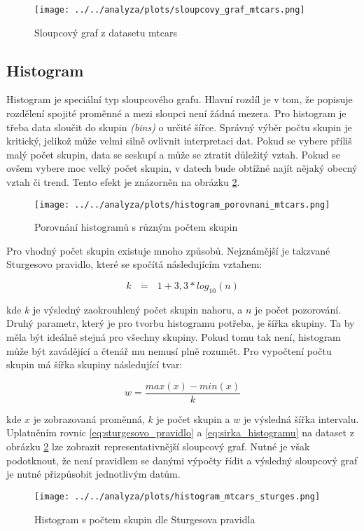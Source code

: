 \begin{figure}[H]
    \centering
    \texttt{[image: ../../analyza/plots/sloupcovy\_graf\_mtcars.png]}
    \caption{Sloupcový graf z datasetu mtcars} 
    \label{fig:sloupcovy_graf_mtcars}
\end{figure}

\subsection{Histogram}

Histogram je speciální typ sloupcového grafu. Hlavní rozdíl je v tom, že popisuje rozdělení spojité proměnné a mezi sloupci není žádná mezera.
Pro histogram je třeba data sloučit do skupin \textit{(bins)} o určité šířce. Správný výběr počtu skupin je kritický, jelikož může velmi
silně ovlivnit interpretaci dat. Pokud se vybere příliš malý počet skupin, data se seskupí a může se ztratit důležitý vztah. Pokud se ovšem
vybere moc velký počet skupin, v datech bude obtížné najít nějaký obecný vztah či trend.
Tento efekt je znázorněn na obrázku \ref{fig:histogram_porovnani_mtcars}.

\begin{figure}[H]
    \centering
    \texttt{[image: ../../analyza/plots/histogram\_porovnani\_mtcars.png]}
    \caption{Porovnání histogramů s různým počtem skupin} 
    \label{fig:histogram_porovnani_mtcars}
\end{figure}

Pro vhodný počet skupin existuje mnoho způsobů. Nejznámější je takzvané Sturgesovo pravidlo, které se spočítá následujícím vztahem:

\begin{equation}
    \label{eq:sturgesovo_pravidlo}
    k \text{ } \dot{\mathbf{=}} \text{ } 1 + 3,3 * log_{10}(n)
\end{equation}

kde $k$ je výsledný zaokrouhlený počet skupin nahoru, 
a $n$ je počet pozorování. Druhý parametr, který je pro tvorbu histogramu potřeba, je šířka skupiny.
Ta by měla být ideálně stejná pro všechny skupiny. Pokud tomu tak není, histogram může být zavádějící a čtenář mu nemusí plně rozumět.
Pro vypočtení počtu skupin má šířka skupiny následující tvar:

\begin{equation}
    \label{eq:sirka_histogramu}
    w = \frac{max(x) - min(x)}{k}
\end{equation}

kde $x$ je zobrazovaná proměnná, $k$ je počet skupin a $w$ je výsledná šířka intervalu. 
{\color{red}
Uplatněním rovnic \ref{eq:sturgesovo_pravidlo} a \ref{eq:sirka_histogramu} na dataset z obrázku \ref{fig:histogram_porovnani_mtcars}
lze zobrazit representativnější sloupcový graf. Nutné je však podotknout, že není pravidlem se danými výpočty řídit a výsledný
sloupcový graf je nutné přizpůsobit jednotlivým datům.
}
\begin{figure}[H]
    \centering
    \texttt{[image: ../../analyza/plots/histogram\_mtcars\_sturges.png]}
    \caption{Histogram s počtem skupin dle Sturgesova pravidla} 
    \label{fig:histogram_mtcars_sturges}
\end{figure}

